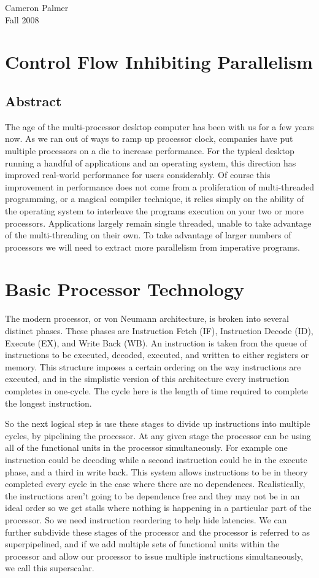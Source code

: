\documentclass[12pt,twoside,letterpaper]{article}
\begin{document}
Cameron Palmer \\
Fall 2008

\section*{Control Flow Inhibiting Parallelism}

\subsection*{Abstract}
The age of the multi-processor desktop computer has been with us for a few years now. As we ran out of ways to ramp up processor clock, companies have put multiple processors on a die to increase performance. For the typical desktop running a handful of applications and an operating system, this direction has improved real-world performance for users considerably. Of course this improvement in performance does not come from a proliferation of multi-threaded programming, or a magical compiler technique, it relies simply on the ability of the operating system to interleave the programs execution on your two or more processors. Applications largely remain single threaded, unable to take advantage of the multi-threading on their own. To take advantage of larger numbers of processors we will need to extract more parallelism from imperative programs.

\section*{Basic Processor Technology}
The modern processor, or von Neumann architecture, is broken into several distinct phases. These phases are Instruction Fetch (IF), Instruction Decode (ID), Execute (EX), and Write Back (WB). An instruction is taken from the queue of instructions to be executed, decoded, executed, and written to either registers or memory. This structure imposes a certain ordering on the way instructions are executed, and in the simplistic version of this architecture every instruction completes in one-cycle. The cycle here is the length of time required to complete the longest instruction.

So the next logical step is use these stages to divide up instructions into multiple cycles, by pipelining the processor. At any given stage the processor can be using all of the functional units in the processor simultaneously. For example one instruction could be decoding while a second instruction could be in the execute phase, and a third in write back. This system allows instructions to be in theory completed every cycle in the case where there are no dependences. Realistically, the instructions aren't going to be dependence free and they may not be in an ideal order so we get stalls where nothing is happening in a particular part of the processor. So we need instruction reordering to help hide latencies. We can further subdivide these stages of the processor and the processor is referred to as superpipelined, and if we add multiple sets of functional units within the processor and allow our processor to issue multiple instructions simultaneously, we call this superscalar.
\end{document}
